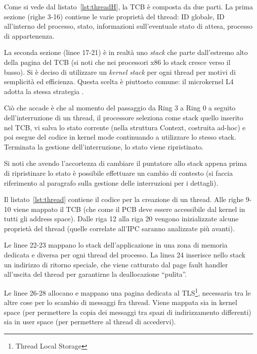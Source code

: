 \documentclass[12pt,a4paper]{report}
\newcommand{\vir}[1]{``#1''}
\begin{document}
				
				
				Come si vede dal listato~\ref{lst:threadH}, la TCB è composta da due parti. La prima sezione (righe 3-16)
				contiene le varie proprietà del thread: ID globale, ID all'interno del processo, stato, informazioni sull'eventuale
				stato di attesa, processo di appartenenza.
				
				La seconda sezione (linee 17-21) è in realtà uno \emph{stack} che parte dall'estremo alto della pagina
				del TCB (si noti che nei processori x86 lo stack cresce verso il basso).
				Si è deciso di utilizzare un \emph{kernel stack} per ogni thread per motivi di semplicità ed efficienza.
				Questa scelta è piuttosto comune: il microkernel L4 adotta la stessa strategia \cite{Neider}.
				
				Ciò che accade è che al momento del passaggio da Ring 3 a Ring 0 a seguito dell'interruzione di un
				thread, il processore seleziona come stack quello inserito nel TCB, vi salva lo stato corrente (nella
				struttura Context, costruita ad-hoc) e poi esegue del codice in kernel mode continuando a utilizzare
				lo stesso stack. Terminata la gestione dell'interruzione, lo stato viene ripristinato.
				
				Si noti che avendo l'accortezza di cambiare il puntatore allo stack appena prima di ripristinare lo stato
				è possibile effettuare un cambio di contesto (si faccia riferimento al paragrafo sulla gestione delle interruzioni
				per i dettagli).
								
				
				
				Il listato~\ref{lst:thread} contiene il codice per la creazione di un thread.
				Alle righe 9-10 viene mappato il TCB (che come il PCB deve essere accessibile dal kernel
				in tutti gli address space). Dalle riga 12 alla riga 20 vengono inizializzate alcune proprietà
				del thread (quelle correlate all'IPC saranno analizzate più avanti).
				
				Le linee 22-23 mappano lo stack dell'applicazione in una zona di memoria dedicata
				e diversa per ogni thread del processo.
				La linea 24 inserisce nello stack un indirizzo di ritorno speciale, che viene catturato
				dal page fault handler all'uscita del thread per garantirne la deallocazione \vir{pulita}.
				
				Le linee 26-28 allocano e mappano una pagina dedicata al TLS\footnote{Thread Local Storage},
				necessaria tra le altre cose per lo scambio di messaggi fra thread. Viene mappata sia in
				kernel space (per permettere la copia dei messaggi tra spazi di indirizzamento differenti)
				sia in user space (per permettere al thread di accedervi).
				
\end{document}
